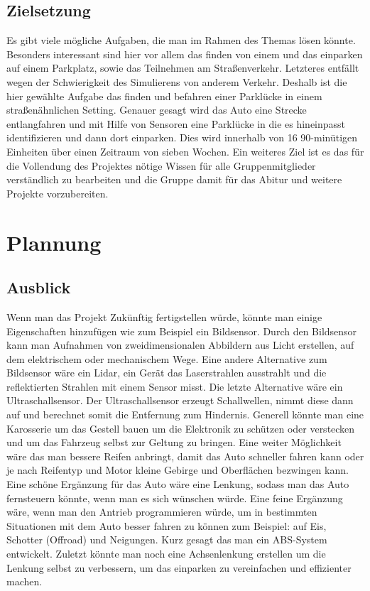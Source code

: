 \documentclass[notitlepage]{report}
\begin{document}
\section{Zielsetzung}
Es gibt viele m\"{o}gliche Aufgaben, die man im Rahmen des Themas l\"{o}sen k\"{o}nnte. Besonders interessant sind hier vor allem das finden von einem und das einparken auf einem Parkplatz, sowie das Teilnehmen am Stra{\ss}enverkehr. Letzteres entf\"{a}llt wegen der Schwierigkeit des Simulierens von anderem Verkehr. Deshalb ist die hier gew\"{a}hlte Aufgabe das finden und befahren einer Parkl\"{u}cke in einem stra{\ss}en\"{a}hnlichen Setting. Genauer gesagt wird das Auto eine Strecke entlangfahren und mit Hilfe von Sensoren eine Parkl\"{u}cke in die es hineinpasst identifizieren und dann dort einparken. Dies wird innerhalb von 16 90-min\"{u}tigen Einheiten \"{u}ber einen Zeitraum von sieben Wochen. Ein weiteres Ziel ist es das f\"{u}r die Vollendung des Projektes n\"{o}tige Wissen f\"{u}r alle Gruppenmitglieder verst\"{a}ndlich zu bearbeiten und die Gruppe damit f\"{u}r das Abitur und weitere Projekte vorzubereiten.

\chapter{Plannung}

\section{Ausblick}

Wenn man das Projekt Zuk\"{u}nftig fertigstellen w\"{u}rde, k\"{o}nnte man einige Eigenschaften hinzuf\"{u}gen wie zum Beispiel ein Bildsensor. Durch den Bildsensor kann man Aufnahmen von zweidimensionalen Abbildern aus Licht erstellen, auf dem elektrischem oder mechanischem Wege. Eine andere Alternative zum Bildsensor w\"{a}re ein Lidar, ein Ger\"{a}t das Laserstrahlen ausstrahlt und die reflektierten Strahlen mit einem Sensor misst. Die letzte Alternative w\"{a}re ein Ultraschallsensor. Der Ultraschallsensor erzeugt Schallwellen, nimmt diese dann auf und berechnet somit die Entfernung zum Hindernis. Generell k\"{o}nnte man eine Karosserie um das Gestell bauen um die Elektronik zu sch\"{u}tzen oder verstecken und um das Fahrzeug selbst zur Geltung zu bringen. Eine weiter M\"{o}glichkeit w\"{a}re das man bessere Reifen anbringt, damit das Auto schneller fahren kann oder je nach Reifentyp und Motor kleine Gebirge und Oberfl\"{a}chen bezwingen kann. Eine sch\"{o}ne Erg\"{a}nzung f\"{u}r das Auto w\"{a}re eine Lenkung, sodass man das Auto fernsteuern k\"{o}nnte, wenn man es sich w\"{u}nschen w\"{u}rde. Eine feine Erg\"{a}nzung w\"{a}re, wenn man den Antrieb programmieren w\"{u}rde, um in bestimmten Situationen mit dem Auto besser fahren zu k\"{o}nnen zum Beispiel: auf Eis, Schotter (Offroad) und Neigungen. Kurz gesagt das man ein ABS-System entwickelt. Zuletzt k\"{o}nnte man noch eine Achsenlenkung erstellen um die Lenkung selbst zu verbessern, um das einparken zu vereinfachen und effizienter machen.
\end{document}
